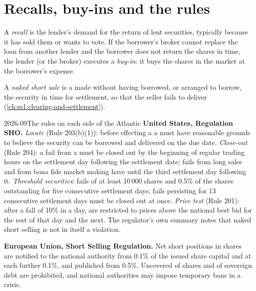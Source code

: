 \section{Recalls, buy-ins and the rules}

\begin{definition}\label{def:m1:stock-loan-and-short-selling:recall}
A \emph{recall} is the lender's demand for the return of lent
securities, typically because it has sold them or wants to vote. If the
borrower's broker cannot replace the loan from another lender and the
borrower does not return the shares in time, the lender (or the broker)
executes a \emph{buy-in}: it buys the shares in the market at
the borrower's expense.
\end{definition}

\begin{definition}\label{def:m1:stock-loan-and-short-selling:naked}
A \emph{naked short sale} is a  made
without having borrowed, or arranged to borrow, the security in time for
settlement, so that the seller fails to deliver
(\cref{ch:m1:clearing-and-settlement}).
\end{definition}

\begin{dated}{2026-09}{The rules on each side of the Atlantic}\label{dat:m1:stock-loan-and-short-selling:rules}
\textbf{United States, Regulation SHO.} \emph{Locate} (Rule 203(b)(1)): before
effecting a  a  must have reasonable grounds to
believe the security can be borrowed and delivered on the due date.
\emph{Close-out} (Rule 204): a fail from a  must be closed out by
the beginning of regular trading hours on the settlement day following the
settlement date; fails from long sales and from bona fide market making have
until the third settlement day following it. \emph{Threshold securities}:
fails of at least 10\,000 shares and 0.5\% of the shares outstanding for five
consecutive settlement days; fails persisting for 13 consecutive settlement
days must be closed out at once. \emph{Price test} (Rule 201): after a
fall of 10\% in a day,  are restricted to prices above the national
best bid for the rest of that day and the next. The regulator's own summary
notes that naked short selling is not in itself a violation.

\textbf{European Union, Short Selling Regulation.} Net short positions in
shares are notified to the national authority from 0.1\% of the issued share
capital and at each further 0.1\%, and published from 0.5\%. Uncovered  of shares and of sovereign debt are prohibited, and national
authorities may impose temporary bans in a crisis.
\end{dated}

